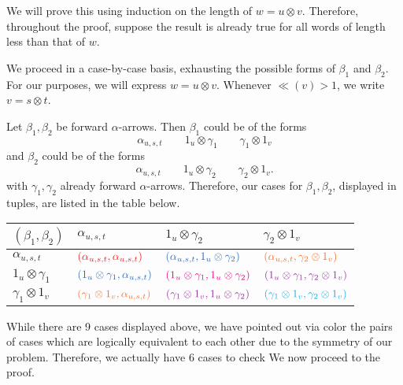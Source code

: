    \begin{prf}
        We will prove this using induction on the length of $w = u \otimes v$.
        Therefore, throughout the proof, suppose the result is already true for all words of length less than that 
        of $w$. 

        We proceed in a case-by-case basis, exhausting the possible forms of $\beta_1$ and $\beta_2$.
        For our purposes, we will express $w = u \otimes v$. 
        Whenever $\ll(v) > 1$, we write $v= s \otimes t$. 
        
        Let $\beta_1, \beta_2$ be forward $\alpha$-arrows. 
        Then $\beta_1$ could be of the forms
        \[
            \alpha_{u,s,t}\qquad 1_u \otimes \gamma_1 \qquad \gamma_1\otimes 1_v
        \]
        and $\beta_2$ could be of the forms 
        \[
            \alpha_{u,s,t}\qquad 1_u\otimes\gamma_2 \qquad \gamma_2\otimes 1_v.
        \]
        with $\gamma_1, \gamma_2$ already forward $\alpha$-arrows.
        Therefore, our cases for $\beta_1,\beta_2$, 
        displayed in tuples, are listed in the table below.
        \begin{center}
            \begin{tabular}{ p{1.2cm} |p{3cm} p{3cm} p{3cm}  }
                $(\beta_1,\beta_2)$
                &
                $\alpha_{u,s,t}$
                &
                $1_u\otimes \gamma_2$
                &
                $\gamma_2 \otimes 1_v$
                \\[0.2cm]
                \hline
                $\alpha_{u,s,t}$
                &
                $\textcolor{Red}{(\alpha_{u,s,t}, \alpha_{u,s,t})}$ & $\textcolor{NavyBlue}{(\alpha_{u,s,t},1_u \otimes \gamma_2)}$ 
                & $\textcolor{Orange}{(\alpha_{u,s,t}, \gamma_2\otimes 1_v)}$\\[0.2cm]
                $1_u \otimes \gamma_1$
                &
                $\textcolor{NavyBlue}{(1_u \otimes \gamma_1, \alpha_{u,s,t})}$ 
                & $\textcolor{Magenta}{(1_u \otimes \gamma_1 ,1_u \otimes \gamma_2)}$ 
                & $\textcolor{Purple}{(1_u \otimes \gamma_1, \gamma_2\otimes 1_v)}$\\[0.2cm]
                $\gamma_1\otimes 1_v$
                &
                $\textcolor{Orange}{(\gamma_1\otimes 1_v, \alpha_{u,s,t})}$ 
                & $\textcolor{Purple}{(\gamma_1\otimes 1_v ,1_u \otimes \gamma_2)}$ 
                & $\textcolor{ProcessBlue}{(\gamma_1\otimes 1_v, \gamma_2\otimes 1_v)}$\\[0.2cm]
                \end{tabular}
        \end{center}    
        While there are 9 cases displayed above, we have pointed out via color the pairs of cases which are logically 
        equivalent to each other due to the symmetry of our problem. Therefore, we actually have 6 cases to check 
        We now proceed to the proof.
    

\end{prf}
